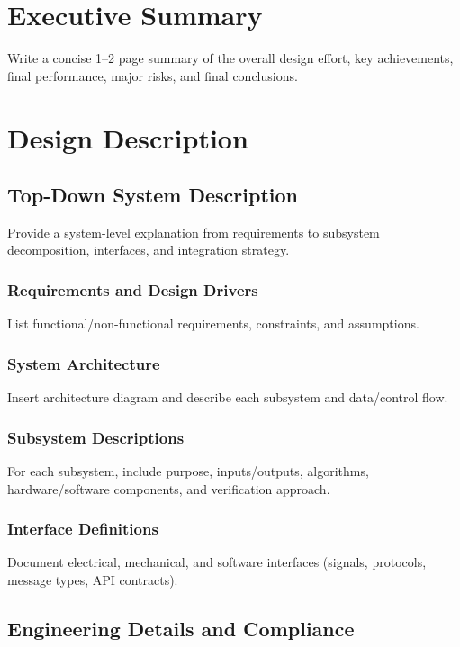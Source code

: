 \documentclass[12pt,a4paper]{report}
\begin{document}
\chapter*{Executive Summary}
Write a concise 1--2 page summary of the overall design effort, key achievements, final performance, major risks, and final conclusions.

\chapter{Design Description}

\section{Top-Down System Description}
Provide a system-level explanation from requirements to subsystem decomposition, interfaces, and integration strategy.

\subsection{Requirements and Design Drivers}
List functional/non-functional requirements, constraints, and assumptions.

\subsection{System Architecture}
Insert architecture diagram and describe each subsystem and data/control flow.

\subsection{Subsystem Descriptions}
For each subsystem, include purpose, inputs/outputs, algorithms, hardware/software components, and verification approach.

\subsection{Interface Definitions}
Document electrical, mechanical, and software interfaces (signals, protocols, message types, API contracts).

\section{Engineering Details and Compliance}
\end{document}
